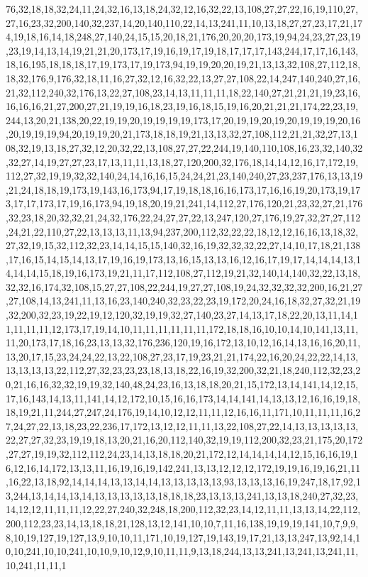 76,32,18,18,32,24,11,24,32,16,13,18,24,32,12,16,32,22,13,108,27,27,22,16,19,110,27,27,16,23,32,200,140,32,237,14,20,140,110,22,14,13,241,11,10,13,18,27,27,23,17,21,174,19,18,16,14,18,248,27,140,24,15,15,20,18,21,176,20,20,20,173,19,94,24,23,27,23,19,23,19,14,13,14,19,21,21,20,173,17,19,16,19,17,19,18,17,17,17,143,244,17,17,16,143,18,16,195,18,18,18,17,19,173,17,19,173,94,19,19,20,20,19,21,13,13,32,108,27,112,18,18,32,176,9,176,32,18,11,16,27,32,12,16,32,22,13,27,27,108,22,14,247,140,240,27,16,21,32,112,240,32,176,13,22,27,108,23,14,13,11,11,11,18,22,140,27,21,21,21,19,23,16,16,16,16,21,27,200,27,21,19,19,16,18,23,19,16,18,15,19,16,20,21,21,21,174,22,23,19,244,13,20,21,138,20,22,19,19,20,19,19,19,19,173,17,20,19,19,20,19,20,19,19,19,20,16,20,19,19,19,94,20,19,19,20,21,173,18,18,19,21,13,13,32,27,108,112,21,21,32,27,13,108,32,19,13,18,27,32,12,20,32,22,13,108,27,27,22,244,19,140,110,108,16,23,32,140,32,32,27,14,19,27,27,23,17,13,11,11,13,18,27,120,200,32,176,18,14,14,12,16,17,172,19,112,27,32,19,19,32,32,140,24,14,16,16,15,24,24,21,23,140,240,27,23,237,176,13,13,19,21,24,18,18,19,173,19,143,16,173,94,17,19,18,18,16,16,173,17,16,16,19,20,173,19,173,17,17,173,17,19,16,173,94,19,18,20,19,21,241,14,112,27,176,120,21,23,32,27,21,176,32,23,18,20,32,32,21,24,32,176,22,24,27,27,22,13,247,120,27,176,19,27,32,27,27,112,24,21,22,110,27,22,13,13,13,11,13,94,237,200,112,32,22,22,18,12,12,16,16,13,18,32,27,32,19,15,32,112,32,23,14,14,15,15,140,32,16,19,32,32,32,22,27,14,10,17,18,21,138,17,16,15,14,15,14,13,17,19,16,19,173,13,16,15,13,13,16,12,16,17,19,17,14,14,14,13,14,14,14,15,18,19,16,173,19,21,11,17,112,108,27,112,19,21,32,140,14,140,32,22,13,18,32,32,16,174,32,108,15,27,27,108,22,244,19,27,27,108,19,24,32,32,32,32,200,16,21,27,27,108,14,13,241,11,13,16,23,140,240,32,23,22,23,19,172,20,24,16,18,32,27,32,21,19,32,200,32,23,19,22,19,12,120,32,19,19,32,27,140,23,27,14,13,17,18,22,20,13,11,14,11,11,11,11,12,173,17,19,14,10,11,11,11,11,11,11,172,18,18,16,10,10,14,10,141,13,11,11,20,173,17,18,16,23,13,13,32,176,236,120,19,16,172,13,10,12,16,14,13,16,16,20,11,13,20,17,15,23,24,24,22,13,22,108,27,23,17,19,23,21,21,174,22,16,20,24,22,22,14,13,13,13,13,13,22,112,27,32,23,23,23,18,13,18,22,16,19,32,200,32,21,18,240,112,32,23,20,21,16,16,32,32,19,19,32,140,48,24,23,16,13,18,18,20,21,15,172,13,14,141,14,12,15,17,16,143,14,13,11,141,14,12,172,10,15,16,16,173,14,14,141,14,13,13,12,16,16,19,18,18,19,21,11,244,27,247,24,176,19,14,10,12,12,11,11,12,16,16,11,171,10,11,11,11,16,27,24,27,22,13,18,23,22,236,17,172,13,12,12,11,11,13,22,108,27,22,14,13,13,13,13,13,22,27,27,32,23,19,19,18,13,20,21,16,20,112,140,32,19,19,112,200,32,23,21,175,20,172,27,27,19,19,32,112,112,24,23,14,13,18,18,20,21,172,12,14,14,14,14,12,15,16,16,19,16,12,16,14,172,13,13,11,16,19,16,19,142,241,13,13,12,12,12,172,19,19,16,19,16,21,11,16,22,13,18,92,14,14,14,13,13,14,14,13,13,13,13,13,93,13,13,13,16,19,247,18,17,92,13,244,13,14,14,13,14,13,13,13,13,13,18,18,18,23,13,13,13,241,13,13,18,240,27,32,23,14,12,12,11,11,11,12,22,27,240,32,248,18,200,112,32,23,14,12,11,11,13,13,14,22,112,200,112,23,23,14,13,18,18,21,128,13,12,141,10,10,7,11,16,138,19,19,19,141,10,7,9,9,8,10,19,127,19,127,13,9,10,10,11,171,10,19,127,19,143,19,17,21,13,13,247,13,92,14,10,10,241,10,10,241,10,10,9,10,12,9,10,11,11,9,13,18,244,13,13,241,13,241,13,241,11,10,241,11,11,1